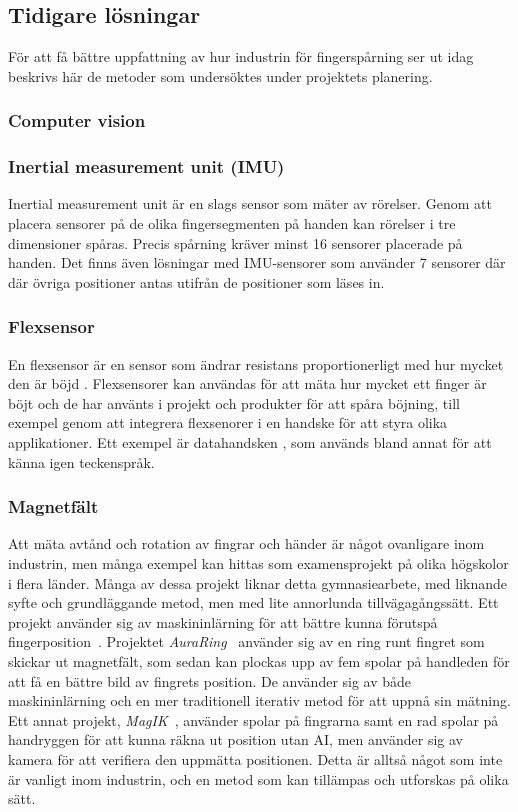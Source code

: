 \documentclass[a4paper]{article}
\begin{document}
\begin{sloppypar}
    \subsection{Tidigare lösningar}
    För att få bättre uppfattning av hur industrin för fingerspårning ser ut idag beskrivs här de metoder som undersöktes under projektets planering.
    \subsubsection{Computer vision}

    \subsubsection{Inertial measurement unit (IMU)}
    Inertial measurement unit är en slags sensor som mäter av rörelser. Genom att
    placera sensorer på de olika fingersegmenten på handen kan rörelser i tre
    dimensioner spåras. Precis spårning kräver minst 16 sensorer placerade på
    handen. Det finns även lösningar med IMU-sensorer som använder 7 sensorer
    där där övriga positioner antas utifrån de positioner som läses in.\cite{wiki:Finger_tracking}

    \subsubsection{Flexsensor}
    En flexsensor är en sensor som ändrar resistans proportionerligt med hur mycket den är böjd \cite{wiki:Flex_sensor}.
    Flexsensorer kan användas för att mäta hur mycket ett finger är böjt och de har använts i projekt och produkter för att spåra böjning, till exempel genom att integrera flexsenorer i en handske för att styra olika applikationer. Ett exempel är datahandsken \cite{wiki:Wired_glove}, som används bland annat för att känna igen teckenspråk.

    \subsubsection{Magnetfält}
    Att mäta avtånd och rotation av fingrar och händer är något ovanligare inom industrin, men många exempel kan hittas som examensprojekt på olika högskolor i flera länder.
    Många av dessa projekt liknar detta gymnasiearbete, med liknande syfte och grundläggande metod, men med lite annorlunda tillvägagångssätt.
    Ett projekt använder sig av maskininlärning för att bättre kunna förutspå fingerposition~\cite{article:sci-rep-mag-ind}.
    Projektet \textit{AuraRing}~\cite{article:AuraRing} använder sig av en ring runt fingret som skickar ut magnetfält, som sedan kan plockas upp av fem spolar på handleden för att få en bättre bild av fingrets position.
    De använder sig av både maskininlärning och en mer traditionell iterativ metod för att uppnå sin mätning.
    Ett annat projekt, \textit{MagIK}~\cite{article:MagIK}, använder spolar på fingrarna samt en rad spolar på handryggen för att kunna räkna ut position utan AI, men använder sig av kamera för att verifiera den uppmätta positionen.
    Detta är alltså något som inte är vanligt inom industrin, och en metod som kan tillämpas och utforskas på olika sätt.


\end{sloppypar}
\end{document}
